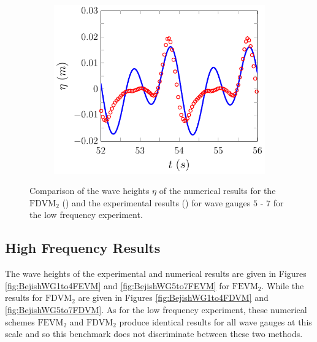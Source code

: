 \begin{figure}
	\begin{subfigure}{0.5\textwidth}
		\includegraphics[width=\textwidth]{./chp6/figures/Experiment/Beji/sl/FDVMWG7.pdf}
		\vspace{0.5cm}
	\end{subfigure}
	\caption{Comparison of the wave heights $\eta$ of the numerical results for the $\text{FDVM}_2$ ({\color{blue}\solidrule}) and the experimental results () for wave gauges $5$ - $7$ for the low frequency experiment.}
	\label{fig:BejislWG5to7FDVM}
\end{figure}

\subsection{High Frequency Results}
The wave heights of the experimental and numerical results are given in Figures \ref{fig:BejishWG1to4FEVM} and \ref{fig:BejishWG5to7FEVM} for $\text{FEVM}_2$. While the results for $\text{FDVM}_2$ are given in Figures \ref{fig:BejishWG1to4FDVM} and \ref{fig:BejishWG5to7FDVM}. As for the low frequency experiment, these numerical schemes $\text{FEVM}_2$ and $\text{FDVM}_2$ produce identical results for all wave gauges at this scale and so this benchmark does not discriminate between these two methods. 

